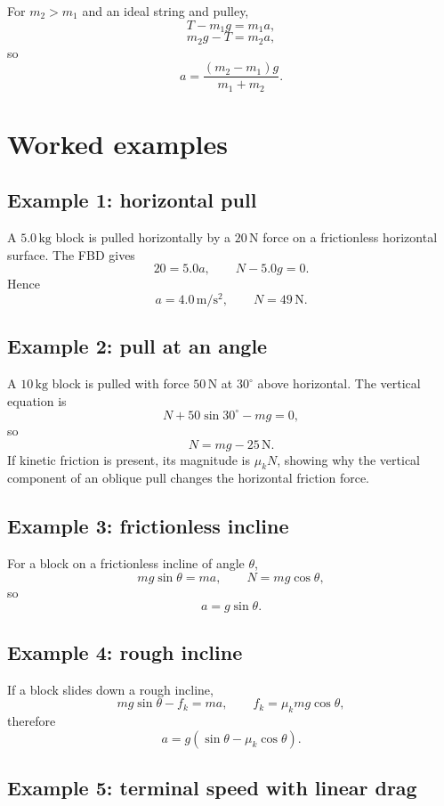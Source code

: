 For $m_2>m_1$ and an ideal string and pulley,
\[
T-m_1g=m_1a,
\]
\[
m_2g-T=m_2a,
\]
so
\[
a=\frac{(m_2-m_1)g}{m_1+m_2}.
\]

\section{Worked examples}

\subsection*{Example 1: horizontal pull}

A $5.0\,\mathrm{kg}$ block is pulled horizontally by a $20\,\mathrm{N}$ force on a frictionless
horizontal surface.  The FBD gives
\[
20=5.0a,
\qquad
N-5.0g=0.
\]
Hence
\[
a=4.0\,\mathrm{m/s^2},
\qquad
N=49\,\mathrm{N}.
\]

\subsection*{Example 2: pull at an angle}

A $10\,\mathrm{kg}$ block is pulled with force $50\,\mathrm{N}$ at $30^\circ$ above horizontal.
The vertical equation is
\[
N+50\sin30^\circ-mg=0,
\]
so
\[
N=mg-25\,\mathrm{N}.
\]
If kinetic friction is present, its magnitude is $\mu_kN$, showing why the vertical component of an
oblique pull changes the horizontal friction force.

\subsection*{Example 3: frictionless incline}

For a block on a frictionless incline of angle $\theta$,
\[
mg\sin\theta=ma,
\qquad
N=mg\cos\theta,
\]
so
\[
a=g\sin\theta.
\]

\subsection*{Example 4: rough incline}

If a block slides down a rough incline,
\[
mg\sin\theta-f_k=ma,
\qquad
f_k=\mu_kmg\cos\theta,
\]
therefore
\[
a=g(\sin\theta-\mu_k\cos\theta).
\]

\subsection*{Example 5: terminal speed with linear drag}

